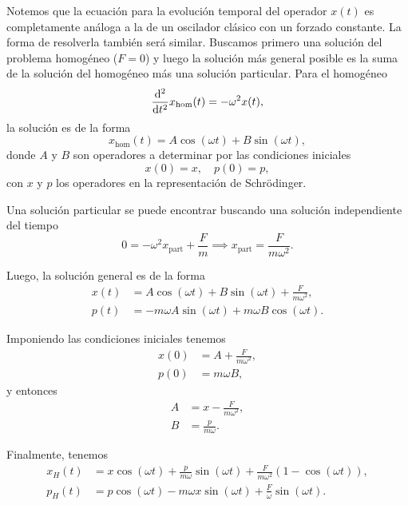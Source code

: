 \documentclass[10pt, a4paper]{article}
\newcommand{\wt}{\omega t}
\numberwithin{equation}{subsection}
\begin{document}
Notemos que la ecuación para la evolución temporal del operador $x(t)$ es
completamente análoga a la de un oscilador clásico con un forzado constante. La
forma de resolverla también será similar. Buscamos primero una solución del
problema homogéneo ($F = 0$) y luego la solución más general posible es la suma
de la solución del homogéneo más una solución particular. Para el homogéneo
\begin{equation}
  \dv[2]{t} x_\text{hom}(t) = -\omega^2 x(t),
\end{equation}
la solución es de la forma
\begin{equation}
  x_\text{hom}(t) = A\cos(\omega t) + B\sin(\omega t),
\end{equation}
donde $A$ y $B$ son operadores a determinar por las condiciones iniciales
\begin{equation}
  x(0) = x, \quad p(0) = p,
\end{equation}
con $x$ y $p$ los operadores en la representación de Schrödinger.

Una solución particular se puede encontrar buscando una solución independiente
del tiempo
\begin{equation}
  0 = -\omega^2 x_\text{part} + \frac{F}{m} \implies
  x_\text{part} = \frac{F}{m\omega^2}.
\end{equation}

Luego, la solución general es de la forma
\begin{align}
  x(t) &= A\cos(\omega t) + B\sin(\omega t) + \frac{F}{m\omega^2}, \\
  p(t) &= -m\omega A\sin(\omega t) + m\omega B\cos(\omega t).
\end{align}

Imponiendo las condiciones iniciales tenemos
\begin{align}
  x(0) &= A + \frac{F}{m\omega^2}, \\
  p(0) &= m\omega B,
\end{align}
y entonces
\begin{align}
  A &= x - \frac{F}{m\omega^2}, \\
  B &= \frac{p}{m\omega}.
\end{align}

Finalmente, tenemos
\begin{align}
  x_H(t) &= x\cos(\wt) + \frac{p}{m\omega}\sin(\wt) +
    \frac{F}{m\omega^2}\left(1 - \cos(\wt)\right), \\
  p_H(t) &= p\cos(\wt) -m\omega x\sin(\wt) +
    \frac{F}{\omega}\sin(\wt).
\end{align}

\end{document}
